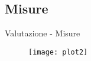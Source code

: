 \subsection{Misure}
\begin{frame}{Valutazione - Misure}
	\begin{figure}
	\texttt{[image: plot2]}
	\end{figure}
	
\end{frame}